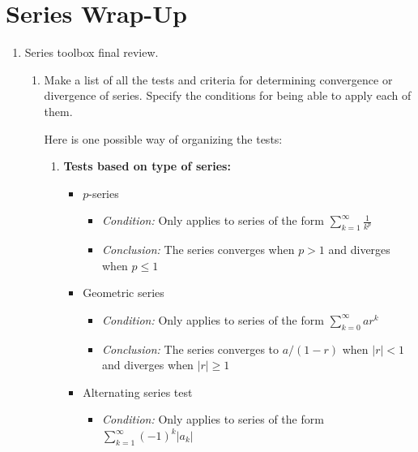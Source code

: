 \documentclass[main]{subfiles}
\begin{document}
\ifSubfilesClassLoaded{%
  \chaptermark{\chaptertwo}
}{}

\section{Series Wrap-Up} \label{ws2-13}
\begin{enumerate}

\item Series toolbox final review.
\begin{enumerate}
    \item 
    \begin{problem}[2.5in]
    Make a list of all the tests and criteria for determining convergence or divergence of series. Specify the conditions for being able to apply each of them.    
    \end{problem}

    \begin{solution}

    Here is one possible way of organizing the tests:

\begin{enumerate}
    \item \textbf{Tests based on type of series:}
        \begin{itemize}
            \item $p$-series
            \begin{itemize}
                \item \textit{Condition:} Only applies to series of the form $\displaystyle\sum_{k=1}^\infty \frac{1}{k^p}$

                \item \textit{Conclusion:} The series converges when $p > 1$ and diverges when $p \leq 1$
            \end{itemize}
            
            \item Geometric series
            \begin{itemize}
                \item \textit{Condition:} Only applies to series of the form $\displaystyle\sum_{k=0}^\infty ar^k$

                \item \textit{Conclusion:} The series converges to $a/(1-r)$ when $|r| <1$ and diverges when $|r| \geq 1$
            \end{itemize}

            \item Alternating series test
            \begin{itemize}
                \item \textit{Condition:} Only applies to series of the form $\displaystyle\sum_{k=1}^\infty (-1)^k|a_k|$


\end{itemize}
\end{itemize}
\end{enumerate}
\end{solution}
\end{enumerate}
\end{enumerate}
\end{document}
